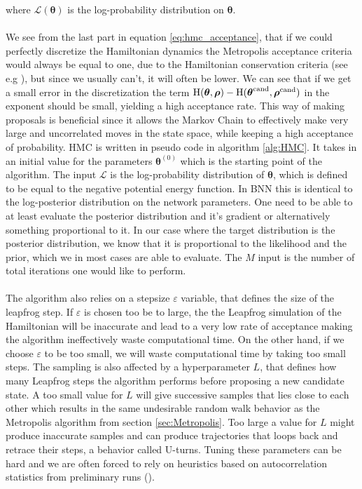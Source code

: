 where $\mathcal{L}\left(\boldsymbol{\theta}\right)$ is the log-probability distribution on $\boldsymbol{\theta}$.
\\ 
\\
We see from the last part in equation \ref{eq:hmc_acceptance}, that if we could perfectly discretize the Hamiltonian dynamics the Metropolis acceptance criteria would always be equal to one, due to the Hamiltonian conservation criteria (see e.g \cite{neal2012mcmc}), but since we usually can't, it will often be lower. We can see that if we get a small error in the discretization the term  $\operatorname{H}(\boldsymbol{\theta},\boldsymbol{\rho})-\operatorname{H}(\boldsymbol{\theta}^{\text{cand}},\boldsymbol{\rho}^{\text{cand}})$ in the exponent should be small, yielding a high acceptance rate. This way of making proposals is beneficial since it allows the Markov Chain to effectively make very large and uncorrelated moves in the state space, while keeping a high acceptance of probability. HMC is written in pseudo code in algorithm \ref{alg:HMC}. It takes in an initial value for the parameters $\boldsymbol{\theta}^{(0)}$ which is the starting point of the algorithm. The input $\mathcal{L}$ is the log-probability distribution of $\boldsymbol{\theta}$, which is defined to be equal to the negative potential energy function. In BNN this is identical to the log-posterior distribution on the network parameters. One need to be able to at least evaluate the posterior distribution and it's gradient or alternatively something proportional to it. In our case where the target distribution is the posterior distribution, we know that it is proportional to the likelihood and the prior, which we in most cases are able to evaluate. The $M$ input is the number of total iterations one would like to perform.
\\
\\
The algorithm also relies on a stepsize $\varepsilon$ variable, that defines the size of the leapfrog step. If $\varepsilon$ is chosen too be to large, the the Leapfrog simulation of the Hamiltonian will be inaccurate and lead to a very low rate of acceptance making the algorithm ineffectively waste computational time. On the other hand, if we choose $\varepsilon$ to be too small, we will waste computational time by taking too small steps. The sampling is also affected by a hyperparameter $L$, that defines how many Leapfrog steps the algorithm performs before proposing a new candidate state. A too small value for $L$ will give successive samples that lies close to each other which results in the same undesirable random walk behavior as the Metropolis algorithm from section \ref{sec:Metropolis}. Too large a value for $L$ might produce inaccurate samples and can produce trajectories that loops back and retrace their steps, a behavior called U-turns. Tuning these parameters can be hard and we are often forced to rely on heuristics based on autocorrelation statistics from preliminary runs (\cite{neal2012mcmc}).
